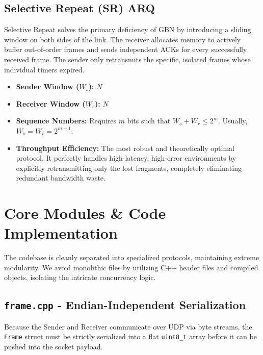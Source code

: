 \documentclass[12pt, a4paper]{article}
\begin{document}
\subsection{Selective Repeat (SR) ARQ}
Selective Repeat solves the primary deficiency of GBN by introducing a sliding window on both sides of the link. The receiver allocates memory to actively buffer out-of-order frames and sends independent ACKs for every successfully received frame. The sender only retransmits the specific, isolated frames whose individual timers expired.
\begin{itemize}
    \item \textbf{Sender Window ($W_s$):} $N$
    \item \textbf{Receiver Window ($W_r$):} $N$
    \item \textbf{Sequence Numbers:} Requires $m$ bits such that $W_s + W_r \le 2^m$. Usually, $W_s = W_r = 2^{m-1}$.
    \item \textbf{Throughput Efficiency:} The most robust and theoretically optimal protocol. It perfectly handles high-latency, high-error environments by explicitly retransmitting only the lost fragments, completely eliminating redundant bandwidth waste.
\end{itemize}


\section{Core Modules \& Code Implementation}
The codebase is cleanly separated into specialized protocols, maintaining extreme modularity. We avoid monolithic files by utilizing C++ header files and compiled objects, isolating the intricate concurrency logic.

\subsection{\texttt{frame.cpp} - Endian-Independent Serialization}
Because the Sender and Receiver communicate over UDP via byte streams, the \texttt{Frame} struct must be strictly serialized into a flat \texttt{uint8\_t} array before it can be pushed into the socket payload.
\end{document}
